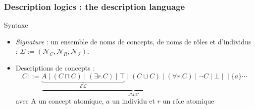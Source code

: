 \documentclass{beamer}
\newcommand{\NC}{\ensuremath{\mathcal{N}_C}}
\newcommand{\NR}{\ensuremath{\mathcal{N}_R}}
\begin{document}
\begin{frame}
 \frametitle{Description logics : the description language}


\begin{block}{Syntaxe}
 \begin{itemize}
 \footnotesize
 \item \emph{Signature} :  un ensemble de noms de concepts, de noms de rôles et d'individus :  $\Sigma:=(\NC{}, \NR,\mathcal{N}_{\mathcal{I}})$.
 \item Descriptions de concepts :
 \[
 C::=\underbrace{\underbrace{A \mid (C \sqcap C) \mid (\exists r.C) \mid \top}_{\mathcal{EL}{}} \mid (C \sqcup C) \mid (\forall r.C) \mid \neg C  \mid \bot \mid}_{\mathcal{ALC}} \mid \{a\}  \cdots  
 \]
 avec A un concept atomique, $a$ un individu et $r$ un rôle atomique
 \end{itemize}
\end{block}
 


 \end{frame} 
\end{document}
